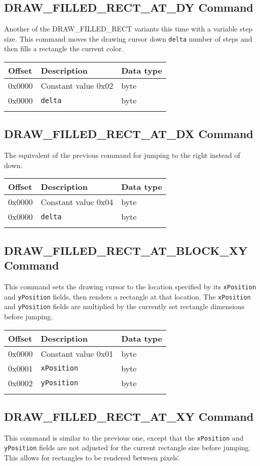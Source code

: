 \documentclass{article}
\newcommand{\field}[1]{\textcolor{fieldColor}{\texttt{#1}}}
\newenvironment{bytelisting}
{\ttfamily \begin{center} \begin{tabular}{l l l} Offset & Description & Data type \\ \hline}
{\normalfont \end{tabular} \end{center}}
\begin{document}
\subsection{DRAW\_FILLED\_RECT\_AT\_DY Command}
Another of the DRAW\_FILLED\_RECT variants this time with a variable step size. This command moves the drawing cursor down \field{delta} number of steps and then fills a rectangle the current color.

\begin{bytelisting}
0x0000 & Constant value 0x02 & byte \\
0x0000 & \field{delta} & byte \\
\end{bytelisting}

\subsection{DRAW\_FILLED\_RECT\_AT\_DX Command}
The equivalent of the previous command for jumping to the right instead of down.

\begin{bytelisting}
0x0000 & Constant value 0x04 & byte \\
0x0000 & \field{delta} & byte \\
\end{bytelisting}

\subsection{DRAW\_FILLED\_RECT\_AT\_BLOCK\_XY Command}
This command sets the drawing cursor to the location specified by its \field{xPosition} and \field{yPosition} fields, then renders a rectangle at that location.
The \field{xPosition} and \field{yPosition} fields are multiplied by the currently set rectangle dimensions before jumping.

\begin{bytelisting}
0x0000 & Constant value 0x01 & byte \\
0x0001 & \field{xPosition} & byte \\
0x0002 & \field{yPosition} & byte \\
\end{bytelisting}

\subsection{DRAW\_FILLED\_RECT\_AT\_XY Command}
This command is similar to the previous one, except that the \field{xPosition} and \field{yPosition} fields are not adjusted for the current rectangle size before jumping.
This allows for rectangles to be rendered \"between pixels\".
\end{document}
